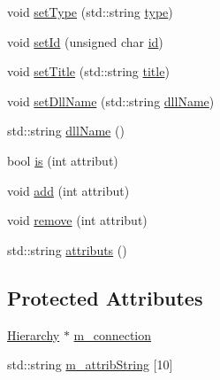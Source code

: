 \begin{DoxyCompactItemize}
\item 
void \hyperlink{classObject_aae534cc9d982bcb9b99fd505f2e103a5}{set\+Type} (std\+::string \hyperlink{classObject_a84f99f70f144a83e1582d1d0f84e4e62}{type})
\item 
void \hyperlink{classObject_a398fe08cba594a0ce6891d59fe4f159f}{set\+Id} (unsigned char \hyperlink{classObject_af99145335cc61ff6e2798ea17db009d2}{id})
\item 
void \hyperlink{classObject_a89557dbbad5bcaa02652f5d7fa35d20f}{set\+Title} (std\+::string \hyperlink{classObject_a73a0f1a41828fdd8303dd662446fb6c3}{title})
\item 
void \hyperlink{classObject_a870c5af919958c2136623b2d7816d123}{set\+Dll\+Name} (std\+::string \hyperlink{classObject_a2e3947f2870094c332d7454117f3ec63}{dll\+Name})
\item 
std\+::string \hyperlink{classObject_a2e3947f2870094c332d7454117f3ec63}{dll\+Name} ()
\item 
bool \hyperlink{classAttrib_a704f26af560909ad22065083bb7d4c34}{is} (int attribut)
\item 
void \hyperlink{classAttrib_a235f773af19c900264a190b00a3b4ad7}{add} (int attribut)
\item 
void \hyperlink{classAttrib_a7d4ef7e32d93cb287792b87b857e79f3}{remove} (int attribut)
\item 
std\+::string \hyperlink{classAttrib_aee7bbf16b144887f196e1341b24f8a26}{attributs} ()
\end{DoxyCompactItemize}
\subsection*{Protected Attributes}
\begin{DoxyCompactItemize}
\item 
\hyperlink{classHierarchy}{Hierarchy} $\ast$ \hyperlink{classElement_abe3de7a5dbbc9a6dd2d7e012e5fdb266}{m\+\_\+connection}
\item 
std\+::string \hyperlink{classAttrib_a3414521d7a82476e874b25a5407b5e63}{m\+\_\+attrib\+String} \mbox{[}10\mbox{]}
\end{DoxyCompactItemize}
